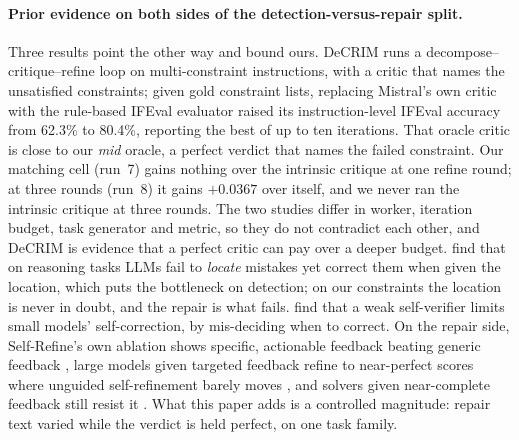 \documentclass[11pt]{article}
\begin{document}
\paragraph{Prior evidence on both sides of the detection-versus-repair split.}
Three results point the other way and bound ours. DeCRIM \citep{ferraz2024decrim} runs a
decompose--critique--refine loop on multi-constraint instructions, with a critic that names the
unsatisfied constraints; given gold constraint lists, replacing Mistral's own critic with the
rule-based IFEval evaluator raised its instruction-level IFEval accuracy from 62.3\% to 80.4\%,
reporting the best of up to ten iterations. That oracle critic is close to our \emph{mid} oracle,
a perfect verdict that names the failed constraint. Our matching cell (run~7) gains nothing over
the intrinsic critique at one refine round; at three rounds (run~8) it gains $+0.0367$ over
itself, and we never ran the intrinsic critique at three rounds. The two studies differ in worker,
iteration budget, task generator and metric, so they do not contradict each other, and DeCRIM is
evidence that a perfect critic can pay over a deeper budget. \citet{tyen2024cannotfind} find that on reasoning tasks LLMs fail to \emph{locate}
mistakes yet correct them when given the location, which puts the bottleneck on detection; on our
constraints the location is never in doubt, and the repair is what fails. \citet{zhang2024smallverifiers}
find that a weak self-verifier limits small models' self-correction, by mis-deciding when
to correct. On the repair side, Self-Refine's own ablation shows specific, actionable
feedback beating generic feedback \citep{madaan2023selfrefine}, large models given targeted
feedback refine to near-perfect scores where unguided self-refinement barely moves
\citep{lee2025refinebench}, and solvers given near-complete feedback still resist it
\citep{jiang2025feedbackfriction}. What this paper adds is a controlled magnitude: repair text
varied while the verdict is held perfect, on one task family.
\end{document}
